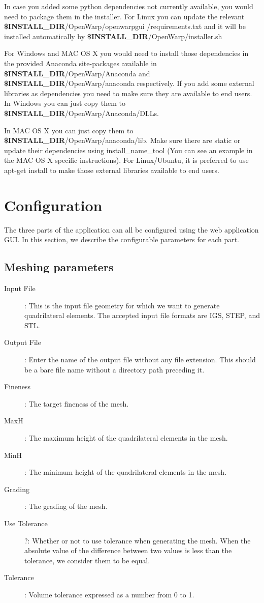 \documentclass[12pt]{article}
\newcommand{\INSTALLDIR}{{\textbf{\$INSTALL{\_}DIR}}}
\begin{document}
In case you added some python dependencies not currently available, you would need to package them in the installer. For Linux you can update the relevant \INSTALLDIR/OpenWarp/openwarpgui /requirements.txt and it will be installed automatically by \INSTALLDIR/OpenWarp/installer.sh

For Windows and MAC OS X you would need to install those dependencies in the provided Anaconda site-packages available in \INSTALLDIR/OpenWarp/Anaconda and \INSTALLDIR/OpenWarp/anaconda respectively.
If you add some external libraries as dependencies you need to make sure they are available to end users. In Windows you can just copy them to \INSTALLDIR/OpenWarp/Anaconda/DLLs.

In MAC OS X you can just copy them to \INSTALLDIR/OpenWarp/anaconda/lib. Make sure there are static or update their dependencies using install_name_tool (You can see an example in the MAC OS X specific instructions).
For Linux/Ubuntu, it is preferred to use apt-get install to make those external libraries available to end users.

\section{Configuration}
The three parts of the application can all be configured using the web application GUI. In this section, we describe the configurable parameters for each part.

\subsection{Meshing parameters}

\begin{description}
	\item [Input File]: This is the input file geometry for which we want to generate quadrilateral elements. The accepted input file formats are IGS, STEP, and STL.
\item [Output File]: Enter the name of the output file without any file extension. This should be a bare file name without a directory path preceding it.
\item [Fineness]: The target fineness of the mesh.
\item [MaxH]: The maximum height of the quadrilateral elements in the mesh. 
\item [MinH]: The minimum height of the quadrilateral elements in the mesh. 
\item [Grading]: The grading of the mesh.
\item [Use Tolerance]?: Whether or not to use tolerance when generating the mesh. When the absolute value of the difference between two values is less than the tolerance, we consider them to be equal.
\item [Tolerance]: Volume tolerance expressed as a number from 0 to 1.
\end{description}
\end{document}
